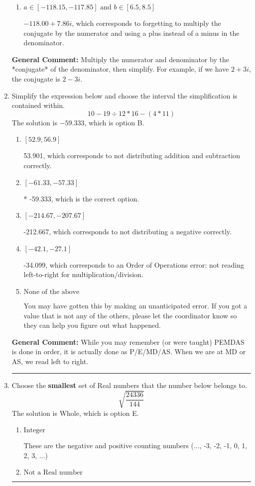 \documentclass{extbook}[14pt]
\newcommand{\litem}[1]{\item #1

\rule{\textwidth}{0.4pt}}
\begin{document}
\begin{enumerate}
{\begin{enumerate}[label=\Alph*.]
* $-3.19  + 7.86 i$, which is the correct option.
\item \( a \in [-118.15, -117.85] \text{ and } b \in [6.5, 8.5] \)

 $-118.00  + 7.86 i$, which corresponds to forgetting to multiply the conjugate by the numerator and using a plus instead of a minus in the denominator.
\end{enumerate}

\textbf{General Comment:} Multiply the numerator and denominator by the *conjugate* of the denominator, then simplify. For example, if we have $2+3i$, the conjugate is $2-3i$.
}
\litem{
Simplify the expression below and choose the interval the simplification is contained within.
\[ 10 - 19 \div 12 * 16 - (4 * 11) \]
The solution is \( -59.333 \), which is option B.\begin{enumerate}[label=\Alph*.]
\item \( [52.9, 56.9] \)

 53.901, which corresponds to not distributing addition and subtraction correctly.
\item \( [-61.33, -57.33] \)

* -59.333, which is the correct option.
\item \( [-214.67, -207.67] \)

 -212.667, which corresponds to not distributing a negative correctly.
\item \( [-42.1, -27.1] \)

 -34.099, which corresponds to an Order of Operations error: not reading left-to-right for multiplication/division.
\item \( \text{None of the above} \)

 You may have gotten this by making an unanticipated error. If you got a value that is not any of the others, please let the coordinator know so they can help you figure out what happened.
\end{enumerate}

\textbf{General Comment:} While you may remember (or were taught) PEMDAS is done in order, it is actually done as P/E/MD/AS. When we are at MD or AS, we read left to right.
}
\litem{
Choose the \textbf{smallest} set of Real numbers that the number below belongs to.
\[ \sqrt{\frac{24336}{144}} \]
The solution is \( \text{Whole} \), which is option E.\begin{enumerate}[label=\Alph*.]
\item \( \text{Integer} \)

These are the negative and positive counting numbers (..., -3, -2, -1, 0, 1, 2, 3, ...)
\item \( \text{Not a Real number} \)


\end{enumerate}}
\end{enumerate}
\end{document}

